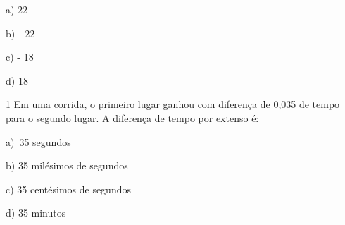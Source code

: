 a) 22

b) - 22

c) - 18

d) 18




\num{1} Em uma corrida, o primeiro lugar ganhou com diferença de 0,035 de
tempo para o segundo lugar. A diferença de tempo por extenso é:

a)~35 segundos

b) 35 milésimos de segundos

c) 35 centésimos de segundos

d) 35 minutos



